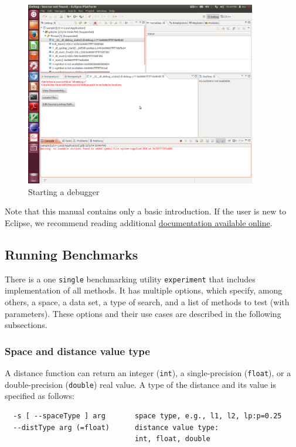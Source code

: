 \documentclass[runningheads,a4paper]{llncs}
\newcommand{\ttt}[1]{\texttt{#1}}
\begin{document}
{\begin{figure}
\caption{\label{FigDebug}Starting a debugger}
\includegraphics[width=0.9\textwidth]{figures/EclipseDebug.pdf}
\end{figure}


Note that this manual contains only a basic introduction.
If the user is new to Eclipse, we recommend reading
additional \href{http://www.eclipse.org/downloads/moreinfo/c.php}{documentation available online}.



\subsection{Running Benchmarks}\label{SectionRunBenchmark}
There is a one \ttt{single} benchmarking utility 
\ttt{experiment} that includes implementation of all methods.
It has multiple options, which specify, among others, 
a space, a data set, a type of search, and a list of methods to test (with parameters).
These options and their use cases are described in the following subsections.

\subsubsection{Space and distance value type}

A distance function can return an integer (\ttt{int}), a single-precision (\ttt{float}),
or a double-precision (\ttt{double}) real value.
A type of the distance and its value is specified as follows:

\begin{verbatim}
  -s [ --spaceType ] arg       space type, e.g., l1, l2, lp:p=0.25
  --distType arg (=float)      distance value type: 
                               int, float, double
\end{verbatim}

}
\end{document}
